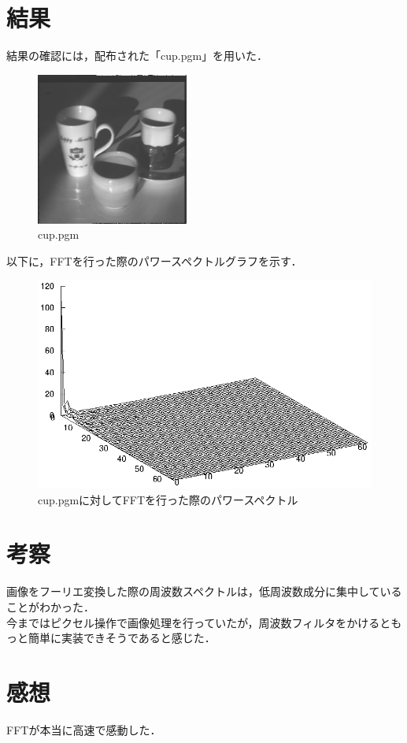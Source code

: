 \documentclass{jsarticle}
\begin{document}
\newpage

\section{結果}
結果の確認には，配布された「cup.pgm」を用いた．
\begin{figure}[H]
  \begin{center}
    \includegraphics[width=5cm]{cup.png}
    \caption{cup.pgm}
  \end{center}
  \label{}
\end{figure}

以下に，FFTを行った際のパワースペクトルグラフを示す．

\begin{figure}[H]
  \begin{center}
    \includegraphics{../power.eps}
    \caption{cup.pgmに対してFFTを行った際のパワースペクトル}
  \end{center}
  \label{}
\end{figure}

\newpage


\section{考察}

画像をフーリエ変換した際の周波数スペクトルは，低周波数成分に集中していることがわかった．\\今まではピクセル操作で画像処理を行っていたが，周波数フィルタをかけるともっと簡単に実装できそうであると感じた．

\section{感想}
FFTが本当に高速で感動した．
\end{document}
